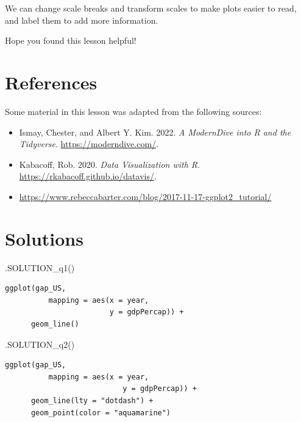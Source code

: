 \documentclass[
  letterpaper,
  DIV=11,
  numbers=noendperiod]{scrreprt}
\newenvironment{Shaded}{\begin{snugshade}}{\end{snugshade}}
\newcommand{\FunctionTok}[1]{\textcolor[rgb]{0.28,0.35,0.67}{#1}}
\newcommand{\NormalTok}[1]{\textcolor[rgb]{0.00,0.23,0.31}{#1}}
\providecommand{\tightlist}{%
  \setlength{\itemsep}{0pt}\setlength{\parskip}{0pt}}\usepackage{longtable,booktabs,array}
\begin{document}
We can change scale breaks and transform scales to make plots easier to
read, and label them to add more information.

Hope you found this lesson helpful!

\hypertarget{references-15}{%
\section*{References}\label{references-15}}


Some material in this lesson was adapted from the following sources:

\begin{itemize}
\tightlist
\item
  Ismay, Chester, and Albert Y. Kim. 2022. \emph{A ModernDive into R and
  the Tidyverse}. \url{https://moderndive.com/}.
\item
  Kabacoff, Rob. 2020. \emph{Data Visualization with R}.
  \url{https://rkabacoff.github.io/datavis/}.
\item
  \url{https://www.rebeccabarter.com/blog/2017-11-17-ggplot2_tutorial/}
\end{itemize}

\hypertarget{solutions-11}{%
\section{Solutions}\label{solutions-11}}

\begin{Shaded}
\begin{Highlighting}[]
\FunctionTok{.SOLUTION\_q1}\NormalTok{()}
\end{Highlighting}
\end{Shaded}

\begin{verbatim}
ggplot(gap_US, 
          mapping = aes(x = year, 
                        y = gdpPercap)) +
      geom_line()
\end{verbatim}

\begin{Shaded}
\begin{Highlighting}[]
\FunctionTok{.SOLUTION\_q2}\NormalTok{()}
\end{Highlighting}
\end{Shaded}

\begin{verbatim}
ggplot(gap_US, 
          mapping = aes(x = year, 
                           y = gdpPercap)) +
      geom_line(lty = "dotdash") +
      geom_point(color = "aquamarine")
\end{verbatim}
\end{document}
